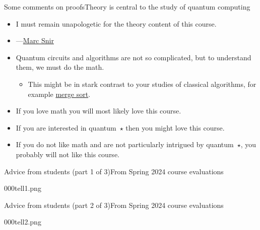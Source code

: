 \begin{frame}{Some comments on proofs}{Theory is central to the study of quantum computing}

\begin{itemize}
    \item I must remain unapologetic for the theory content of this course.
    \item {}---\href{https://snir.cs.illinois.edu/}{Marc Snir}
    \item Quantum circuits and algorithms are not so complicated, but to understand them, we must do the math.
    \begin{itemize}
        \item This might be in stark contrast to your studies of classical algorithms, for example \href{https://en.wikipedia.org/wiki/Merge_sort}{merge sort}.
    \end{itemize}
    \item If you love math you will most likely love this course.
    \item If you are interested in quantum~$\star$ then you might love this course.
    \item If you do not like math and are not particularly intrigued by quantum~$\star$, you probably will not like this course. 
\end{itemize}
    
\end{frame}

\begin{frame}{Advice from students (part 1 of 3)}{From Spring 2024 course evaluations}

\Vskip{-4.1em}\begin{center}\begin{Pixture}[width=0.84\textwidth]{000}{tell1.png}  
\end{Pixture}\end{center}
    
\end{frame}

\begin{frame}{Advice from students (part 2 of 3)}{From Spring 2024 course evaluations}

\Vskip{-3.6em}\begin{center}\begin{Pixture}[width=0.95\textwidth]{000}{tell2.png}  
\end{Pixture}\end{center}
    
\end{frame}

